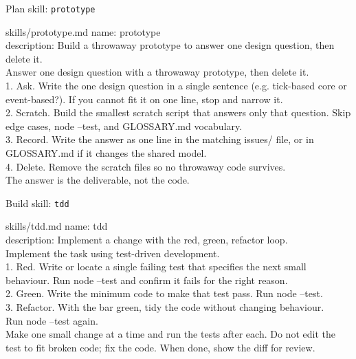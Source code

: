 \begin{frame}{Plan skill: \texttt{prototype}}
  \begin{tdcodet}{skills/prototype.md}
    name: prototype\\
    description: Build a throwaway prototype to answer one design question, then delete it.\\[3pt]
    Answer one design question with a throwaway prototype, then delete it.\\[3pt]
    1. Ask. Write the one design question in a single sentence (e.g. tick-based core or event-based?). If you cannot fit it on one line, stop and narrow it.\\
    2. Scratch. Build the smallest scratch script that answers only that question. Skip edge cases, node --test, and GLOSSARY.md vocabulary.\\
    3. Record. Write the answer as one line in the matching issues/ file, or in GLOSSARY.md if it changes the shared model.\\
    4. Delete. Remove the scratch files so no throwaway code survives.\\[3pt]
    The answer is the deliverable, not the code.
  \end{tdcodet}
\end{frame}


\begin{frame}{Build skill: \texttt{tdd}}
  \begin{tdcodet}{skills/tdd.md}
    name: tdd\\
    description: Implement a change with the red, green, refactor loop.\\[3pt]
    Implement the task using test-driven development.\\[3pt]
    1. Red. Write or locate a single failing test that specifies the next small\\
    \phantom{1. }behaviour. Run node --test and confirm it fails for the right reason.\\
    2. Green. Write the minimum code to make that test pass. Run node --test.\\
    3. Refactor. With the bar green, tidy the code without changing behaviour.\\
    \phantom{3. }Run node --test again.\\[3pt]
    Make one small change at a time and run the tests after each. Do not edit the\\
    test to fit broken code; fix the code. When done, show the diff for review.
  \end{tdcodet}
\end{frame}

